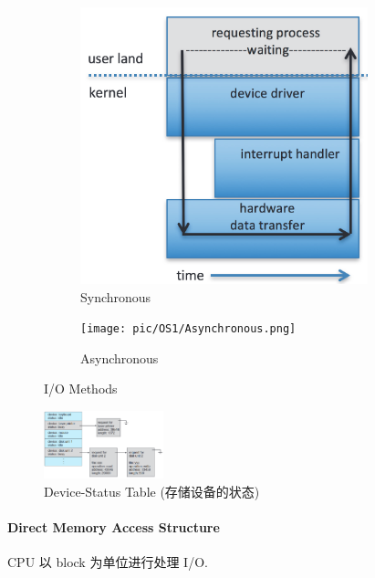 \begin{figure}[!htb]
    \centering
    \begin{subfigure}{0.22\textwidth}
        \centering
        \includegraphics[height=0.9\textwidth]{pic/OS1/Synchronous.png}
        \caption{Synchronous}
    \end{subfigure}
    \begin{subfigure}{0.22\textwidth}
        \centering
        \texttt{[image: pic/OS1/Asynchronous.png]}
        \caption{Asynchronous}
    \end{subfigure}
    \caption{I/O Methods}
\end{figure}

\begin{figure}[!htb]
    \centering
    \includegraphics[width=0.309\textwidth]{pic/OS1/Device-Status Table}
    \caption{Device-Status Table (存储设备的状态)}
\end{figure}

\paragraph{Direct Memory Access Structure} CPU 以 block 为单位进行处理 I/O.

